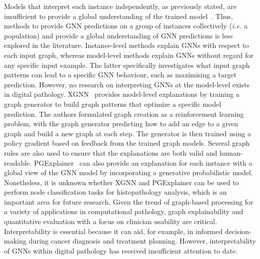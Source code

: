Models that interpret each instance independently, as previously stated, are insufficient to provide a global understanding of the trained model~. Thus, methods to provide GNN predictions on a group of instances collectively (\textit{i.e.} a population) and provide a global understanding of GNN predictions is less explored in the literature.
Instance-level methods explain GNNs with respect to each input graph, whereas model-level methods explain GNNs without regard for any specific input example. The latter specifically investigates what input graph patterns can lead to a specific GNN behaviour, such as maximising a target prediction. However, no research on interpreting GNNs at the model-level exists in digital pathology.
XGNN~ provides model-level explanations by training a graph generator to build graph patterns that optimize a specific model prediction. The authors formulated graph creation as a reinforcement learning problem, with the graph generator predicting how to add an edge to a given graph and build a new graph at each step. The generator is then trained using a policy gradient based on feedback from the trained graph models. Several graph rules are also used to ensure that the explanations are both valid and human-readable. 
PGExplainer~ can also provide an explanation for each instance with a global view of the GNN model by incorporating a generative probabilistic model.
Nonetheless, it is unknown whether XGNN and PGExplainer can be used to perform node classification tasks for histopathology analysis, which is an important area for future research.
Given the trend of graph-based processing for a variety of applications in computational pathology, graph explainability and quantitative evaluation with a focus on clinician usability are critical. Interpretability is essential because it can aid, for example, in informed decision-making during cancer diagnosis and treatment planning. However, interpretability of GNNs within digital pathology has received insufficient attention to date.
\vspace{-6pt}

